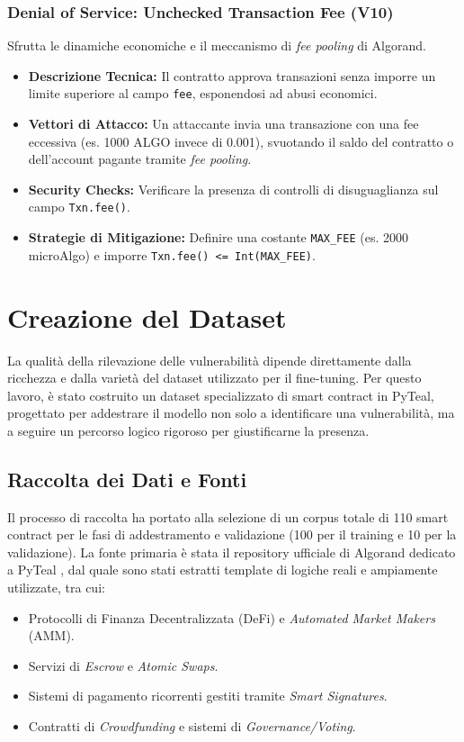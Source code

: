 \subsubsection{Denial of Service: Unchecked Transaction Fee (V10)}
Sfrutta le dinamiche economiche e il meccanismo di \textit{fee pooling} di Algorand.

\begin{itemize}
    \item \textbf{Descrizione Tecnica:} Il contratto approva transazioni senza imporre un limite superiore al campo \texttt{fee}, esponendosi ad abusi economici.
    \item \textbf{Vettori di Attacco:} Un attaccante invia una transazione con una fee eccessiva (es. 1000 ALGO invece di 0.001), svuotando il saldo del contratto o dell'account pagante tramite \textit{fee pooling}.
    \item \textbf{Security Checks:} Verificare la presenza di controlli di disuguaglianza sul campo \texttt{Txn.fee()}.
    \item \textbf{Strategie di Mitigazione:} Definire una costante \texttt{MAX\_FEE} (es. 2000 microAlgo) e imporre \texttt{Txn.fee() <= Int(MAX\_FEE)}.
\end{itemize}

\section{Creazione del Dataset}
\label{sec:dataset_creation}

La qualità della rilevazione delle vulnerabilità dipende direttamente dalla ricchezza e dalla varietà del dataset utilizzato per il fine-tuning. Per questo lavoro, è stato costruito un dataset specializzato di smart contract in PyTeal, progettato per addestrare il modello non solo a identificare una vulnerabilità, ma a seguire un percorso logico rigoroso per giustificarne la presenza.

\subsection{Raccolta dei Dati e Fonti}
Il processo di raccolta ha portato alla selezione di un corpus totale di 110 smart contract per le fasi di addestramento e validazione (100 per il training e 10 per la validazione). La fonte primaria è stata il repository ufficiale di Algorand dedicato a PyTeal \cite{algorand_pyteal_github}, dal quale sono stati estratti template di logiche reali e ampiamente utilizzate, tra cui:
\begin{itemize}
    \item Protocolli di Finanza Decentralizzata (DeFi) e \textit{Automated Market Makers} (AMM).
    \item Servizi di \textit{Escrow} e \textit{Atomic Swaps}.
    \item Sistemi di pagamento ricorrenti gestiti tramite \textit{Smart Signatures}.
    \item Contratti di \textit{Crowdfunding} e sistemi di \textit{Governance/Voting}.
\end{itemize}

